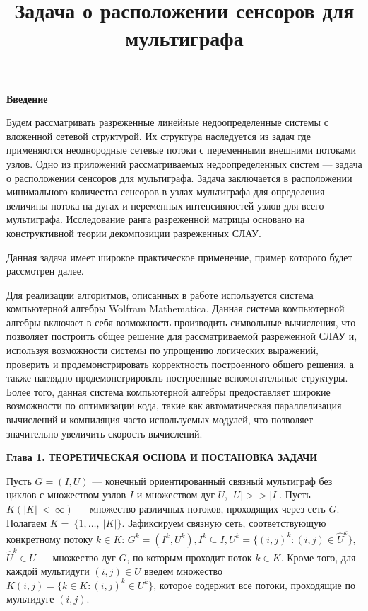\documentclass[14pt]{extarticle}%
\title{Задача о расположении сенсоров для мультиграфа}%
\date{}%
\begin{document}
%
\normalsize%
\vspace{-80pt}%
\begin{center}
    \textbf{Введение}
\end{center}

Будем рассматривать разреженные линейные недоопределенные системы с вложенной сетевой структурой. Их структура наследуется из задач где применяются неоднородные сетевые потоки с переменными внешними потоками узлов. Одно из приложений рассматриваемых недоопределенных систем --- задача о расположении сенсоров для мультиграфа. Задача заключается в расположении минимального количества сенсоров в узлах мультиграфа для определения величины потока на дугах и переменных интенсивностей узлов для всего мультиграфа. Исследование ранга разреженной матрицы основано на конструктивной теории декомпозиции разреженных СЛАУ.

Данная задача имеет широкое практическое применение, пример которого будет рассмотрен далее.

Для реализации алгоритмов, описанных в работе используется система компьютерной алгебры Wolfram Mathematica. Данная система компьютерной алгебры включает в себя возможность производить символьные вычисления, что позволяет построить общее решение для рассматриваемой разреженной СЛАУ и, используя возможности системы по упрощению логических выражений, проверить и продемонстрировать корректность построенного общего решения, а также наглядно продемонстрировать построенные вспомогательные структуры. Более того, данная система компьютерной алгебры предоставляет широкие возможности по оптимизации кода, такие как автоматическая параллелизация вычислений и компиляция часто используемых модулей, что позволяет значительно увеличить скорость вычислений.


\newpage
\begin{center}
    \textbf{Глава 1. ТЕОРЕТИЧЕСКАЯ ОСНОВА И ПОСТАНОВКА ЗАДАЧИ}
\end{center}

Пусть $G=(I,U)$ --- конечный ориентированный связный мультиграф без циклов с множеством узлов $I$ и множеством дуг $U$, $|U|>>|I|$. Пусть \\$K (|K|~<~\infty)$ --- множество различных потоков, проходящих через сеть $G$. Полагаем $K=~\{1,\dots,~|K|\}$. Зафиксируем связную сеть, соответствующую конкретному потоку $k\in K$: $G^k=(I^k, U^k), I^k\subseteq I,U^k=\{(i,j)^k:(i,j)\in \widehat{U}^k\}$,$\widehat{U}^k\in U$ --- множество дуг $G$, по которым проходит поток $k\in K$. Кроме того, для каждой мультидуги $(i,j)\in U$ введем множество $K(i,j)=\{k\in K:(i,j)^k\in U^k\}$, которое содержит все потоки, проходящие по мультидуге $(i,j)$.\\
\end{document}

